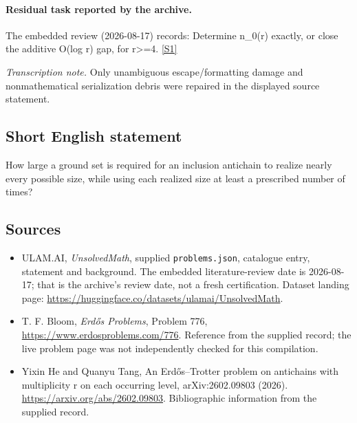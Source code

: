 \documentclass[11pt,a4paper]{article}
\newcommand{\sref}[2]{\hyperlink{source:#1:#2}{[S#2]}}
\begin{document}
\paragraph{Residual task reported by the archive.}

The embedded review (2026-08-17) records: Determine n\_0(r) exactly, or close the additive O(log r) gap, for r>=4. \sref{statement}{1}

{\small\emph{Transcription note.} Only unambiguous escape/formatting damage and nonmathematical serialization debris were repaired in the displayed source statement.}

\subsection{Short English statement}

How large a ground set is required for an inclusion antichain to realize nearly every possible size, while using each realized size at least a prescribed number of times?

\subsection{Sources}

{\small

\begin{itemize}

\item[\hypertarget{source:statement:1}{S1}] ULAM.AI, \emph{UnsolvedMath}, supplied \texttt{problems.json}, catalogue entry, statement and background. The embedded literature-review date is 2026-08-17; that is the archive’s review date, not a fresh certification. Dataset landing page: \url{https://huggingface.co/datasets/ulamai/UnsolvedMath}.

\item[\hypertarget{source:statement:2}{S2}] T. F. Bloom, \emph{Erdős Problems}, Problem 776, \url{https://www.erdosproblems.com/776}. Reference from the supplied record; the live problem page was not independently checked for this compilation.

\item[\hypertarget{source:statement:3}{S3}] Yixin He and Quanyu Tang, An Erdős--Trotter problem on antichains with multiplicity r on each occurring level, arXiv:2602.09803 (2026). \url{https://arxiv.org/abs/2602.09803}. Bibliographic information from the supplied record.

\end{itemize}

}

\label{end:statement}
\end{document}
